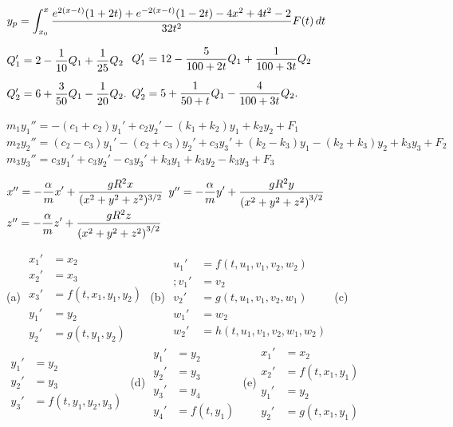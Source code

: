 $y_p=\displaystyle{\int_{x_0}^x
\frac{e^{2(x-t)}(1+2t)+e^{-2(x-t)}(1-2t)-4x^2+4t^2-2}{32t^2}
F(t)\,dt}$



$\begin{aligned}
Q_1'&=\displaystyle{2-\frac{1}{10}Q_1+\frac{1}{25}Q_2}\\[2\jot]
Q_2'&=\displaystyle{6+\frac{3}{50}Q_1-\frac{1}{20}Q_2}.
\end{aligned}$
$\begin{aligned}
Q_1'&=\displaystyle{12-\frac{5}{100+2t}Q_1+\frac{1}{100+3t}Q_2}\\[2\jot]
Q_2'&=\displaystyle{5+\frac{1}{50+t}Q_1-\frac{4}{100+3t}Q_2}.
\end{aligned}$

 $m_1y_1''=-(c_1+c_2)y_1'+c_2y_2'-(k_1+k_2)y_1+k_2y_2+F_1$
$m_2y_2''=(c_2-c_3)y_1'-(c_2+c_3)y_2'+c_3y_3'+(k_2-k_3)y_1
-(k_2+k_3)y_2 +k_3y_3+F_2$
$m_3y_3''=c_3y_1'+c_3y_2'-c_3y_3'+k_3y_1+k_3y_2-k_3y_3+F_3$

$x''=-\displaystyle{\frac{\alpha}{m}x'+\frac{gR^2x}{(x^2+y^2+z^2)^{3/2}}}$\;
 $y''=-\displaystyle{\frac{\alpha}{m}y'+\frac{gR^2y}{\left(x^2+y^2+z^2\right)^{3/2}}}$
$z''=-\displaystyle{\frac{\alpha}{m}z'+\frac{gR^2z}{\left(x^2+y^2+z^2\right)^{3/2}}}$

(a) $\begin{aligned}
x_1'&=x_2\\
x_2'&=x_3\\
x_3'&=f(t,x_1,y_1,y_2)\\
y_1'&=y_2\\
y_2'&=g(t,y_1,y_2)
\end{aligned}$
(b) $\begin{aligned}
u_1'&=f(t,u_1,v_1,v_2,w_2)\\;
v_1'&=v_2\\
v_2'&=g(t,u_1,v_1,v_2,w_1)\\
w_1'&=w_2\\
w_2'&=h(t,u_1,v_1,v_2,w_1,w_2)
\end{aligned}$
(c) $\begin{aligned}
y_1'&=y_2\\
y_2'&=y_3\\
y_3'&=f(t,y_1,y_2,y_3)
\end{aligned}$
(d) $\begin{aligned}
y_1'&=y_2\\
y_2'&=y_3\\
y_3'&=y_4\\
y_4'&=f(t,y_1)
\end{aligned}$
(e)$ \begin{aligned}
x_1'&=x_2\\
x_2'&=f(t,x_1,y_1)\\
y_1'&=y_2\\
y_2'&=g(t,x_1,y_1)
\end{aligned}$

